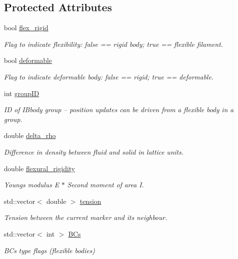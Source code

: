 \subsection*{Protected Attributes}
\begin{DoxyCompactItemize}
\item 
bool \hyperlink{class_i_b_body_a526f3e83b45b991a79941ee745698ea5}{flex\+\_\+rigid}
\begin{DoxyCompactList}\small\item\em Flag to indicate flexibility\+: false == rigid body; true == flexible filament. \end{DoxyCompactList}\item 
bool \hyperlink{class_i_b_body_aac0ea66a55dcb0cf41deb2b9a82743e5}{deformable}
\begin{DoxyCompactList}\small\item\em Flag to indicate deformable body\+: false == rigid; true == deformable. \end{DoxyCompactList}\item 
int \hyperlink{class_i_b_body_a4674ade74a2b55ce60a656acfebb4a55}{group\+ID}
\begin{DoxyCompactList}\small\item\em ID of I\+Bbody group -- position updates can be driven from a flexible body in a group. \end{DoxyCompactList}\item 
double \hyperlink{class_i_b_body_a18cd092961f02ecde55363a4d342d098}{delta\+\_\+rho}
\begin{DoxyCompactList}\small\item\em Difference in density between fluid and solid in lattice units. \end{DoxyCompactList}\item 
double \hyperlink{class_i_b_body_a4825a8ef9155062ff9d1011479bd4a9e}{flexural\+\_\+rigidity}
\begin{DoxyCompactList}\small\item\em Young\textquotesingle{}s modulus E $\ast$ Second moment of area I. \end{DoxyCompactList}\item 
std\+::vector$<$ double $>$ \hyperlink{class_i_b_body_ab786e24bc2b303eefcf286e0138cb2d1}{tension}
\begin{DoxyCompactList}\small\item\em Tension between the current marker and its neighbour. \end{DoxyCompactList}\item 
std\+::vector$<$ int $>$ \hyperlink{class_i_b_body_ad9fa313d9cb2c2c463740eed5a1faf16}{B\+Cs}
\begin{DoxyCompactList}\small\item\em B\+Cs type flags (flexible bodies) \end{DoxyCompactList}\end{DoxyCompactItemize}
